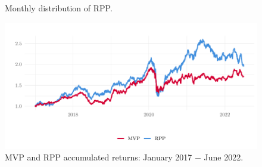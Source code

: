 
\begin{figure}[H]
	\begin{subfigmatrix}{2}
	\end{subfigmatrix}
	\caption{Monthly distribution of RPP.}
	\label{fig:totalRiskPPP}
\end{figure}


\begin{figure}[H]
	\centering
	\includegraphics{figures/retornovolHighLow.pdf}
	\caption{MVP and RPP accumulated returns: January 2017 $-$ June 2022.}
	\label{fig:retornoRPPMVP}
\end{figure}


